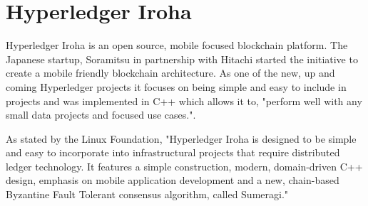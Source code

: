 \section{Hyperledger Iroha}

Hyperledger Iroha is an open source, mobile focused blockchain platform. 
The Japanese startup, Soramitsu in partnership with Hitachi started the 
initiative to create a mobile friendly blockchain architecture. As one of 
the new, up and coming Hyperledger projects it focuses on being simple and 
easy to include in projects and was implemented in C++ which allows it 
to, "perform well with any small data projects and focused use cases."\cite{Behlendorf}.

As stated by the Linux Foundation, "Hyperledger Iroha is designed to be simple 
and easy to incorporate into infrastructural projects that require distributed 
ledger technology. It features a simple construction, modern, domain-driven C++ 
design, emphasis on mobile application development and a new, chain-based Byzantine 
Fault Tolerant consensus algorithm, called Sumeragi."\cite{Active Status Iroha}
